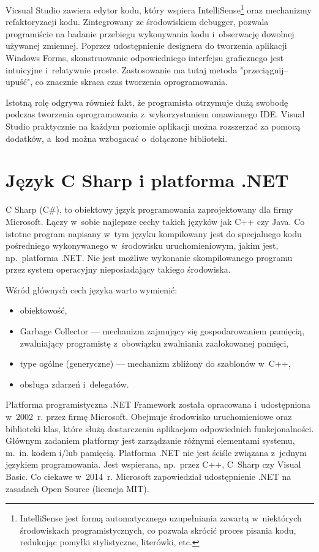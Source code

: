 \documentclass[12pt,a4paper]{report}
\begin{document}
Vicsual Studio zawiera edytor kodu, który wspiera IntelliSense\footnote{IntelliSense jest formą automatycznego uzupełniania zawartą w~niektórych środowiskach programistycznych, co pozwala skrócić proces pisania kodu, redukując pomyłki stylistyczne, literówki, etc.} oraz mechanizmy refaktoryzacji kodu. Zintegrowany ze środowiskiem debugger, pozwala programiście na badanie przebiegu wykonywania kodu i~obserwację dowolnej używanej zmiennej. Poprzez udostępnienie designera do tworzenia aplikacji Windows Forms, skonstruowanie odpowiedniego interfejsu graficznego jest intuicyjne i~relatywnie proste. Zastosowanie ma tutaj metoda "przeciągnij--upuść", co znacznie skraca czas tworzenia oprogramowania.

Istotną rolę odgrywa również fakt, że programista otrzymuje dużą swobodę podczas tworzenia oprogramowania z~wykorzystaniem omawianego IDE. Visual Studio praktycznie na każdym poziomie aplikacji można rozszerzać za pomocą dodatków, a~kod można wzbogacać o~dołączone biblioteki.

\section{Język C Sharp i platforma .NET}
C Sharp (C\#), to obiektowy język programowania zaprojektowany dla firmy Microsoft. Łączy w~sobie najlepsze cechy takich języków jak C++ czy Java. Co istotne program napisany w~tym języku kompilowany jest do specjalnego kodu pośredniego wykonywanego w~środowisku uruchomieniowym, jakim jest, np.~platforma .NET. Nie jest możliwe wykonanie skompilowanego programu przez system operacyjny nieposiadający takiego środowiska.

Wśród głównych cech języka warto wymienić:
\begin{itemize}
  \item obiektowość,
  \item Garbage Collector --- mechanizm zajmujący się gospodarowaniem pamięcią, zwalniający programistę z~obowiązku zwalniania zaalokowanej pamięci,
  \item type ogólne (generyczne) --- mechanizm zbliżony do szablonów w~C++,
  \item obsługa zdarzeń i~delegatów.
\end{itemize}

Platforma programistyczna .NET Framework  została opracowana i~udostępniona w~2002~r. przez firmę Microsoft. Obejmuje środowisko uruchomieniowe oraz biblioteki klas, które służą dostarczeniu aplikacjom odpowiednich funkcjonalności. Głównym zadaniem platformy jest zarządzanie różnymi elementami systemu, m.~in. kodem i/lub pamięcią. Platforma .NET nie jest ściśle związana z~jednym językiem programowania. Jest wspierana, np.~przez C++, C~Sharp czy Visual Basic. Co ciekawe w~2014~r. Microsoft zapowiedział udostępnienie .NET na zasadach Open Source  (licencja MIT).
\end{document}
